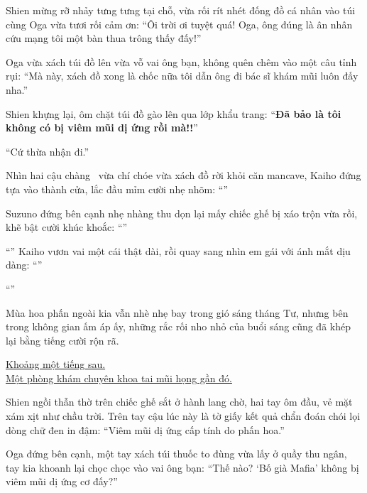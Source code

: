 \documentclass[../main.tex]{subfiles}
\begin{document}
Shien mừng rỡ nhảy tưng tưng tại chỗ, vừa rối rít nhét đống đồ cá nhân vào túi cùng Oga vừa tươi rối cảm ơn: ``Ôi trời ơi tuyệt quá! Oga, ông đúng là ân nhân cứu mạng tôi một bàn thua trông thấy đấy!''

Oga vừa xách túi đồ lên vừa vỗ vai ông bạn, không quên chêm vào một câu tỉnh rụi: ``Mà này, xách đồ xong là chốc nữa tôi dẫn ông đi bác sĩ khám mũi luôn đấy nha.''

Shien khựng lại, ôm chặt túi đồ gào lên qua lớp khẩu trang: ``\textbf{Đã bảo là tôi không có bị viêm mũi dị ứng rồi mà!!}''

``Cứ thừa nhận đi.''

Nhìn hai cậu chàng \hls\ vừa chí chóe vừa xách đồ rời khỏi căn mancave, Kaiho đứng tựa vào thành cửa, lắc đầu mỉm cười nhẹ nhõm: ``''

Suzuno đứng bên cạnh nhẹ nhàng thu dọn lại mấy chiếc ghế bị xáo trộn vừa rồi, khẽ bật cười khúc khoắc: ``''

``'' Kaiho vươn vai một cái thật dài, rồi quay sang nhìn em gái với ánh mắt dịu dàng: ``''

``''

Mùa hoa phấn ngoài kia vẫn nhè nhẹ bay trong gió sáng tháng Tư, nhưng bên trong không gian ấm áp ấy, những rắc rối nho nhỏ của buổi sáng cũng đã khép lại bằng tiếng cười rộn rã.
\omk

\begin{center}
    \uline{Khoảng một tiếng sau.\\Một phòng khám chuyên khoa tai mũi họng gần đó.}
\end{center}

Shien ngồi thẫn thờ trên chiếc ghế sắt ở hành lang chờ, hai tay ôm đầu, vẻ mặt xám xịt như chầu trời. Trên tay cậu lúc này là tờ giấy kết quả chẩn đoán chói lọi dòng chữ đen in đậm: ``Viêm mũi dị ứng cấp tính do phấn hoa.''

Oga đứng bên cạnh, một tay xách túi thuốc to đùng vừa lấy ở quầy thu ngân, tay kia khoanh lại chọc chọc vào vai ông bạn: ``Thế nào? `Bố già Mafia' không bị viêm mũi dị ứng cơ đấy?''
\end{document}
